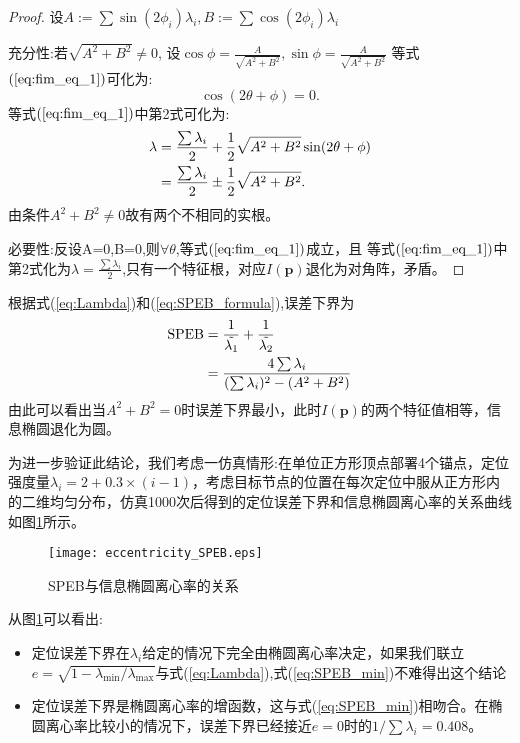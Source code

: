 \begin{proof}
设$A:=\sum\sin(2\phi_i)\lambda_i,B:=\sum\cos(2\phi_i)\lambda_i$

充分性:若$\sqrt{A^2+B^2} \neq 0$,
设$\cos\phi=\frac{A}{\sqrt{A^2+B^2}},\sin\phi=\frac{A}{\sqrt{A^2+B^2}}$
等式$(\ref{eq:fim_eq_1})$可化为:
\begin{equation}
\cos(2\theta+\phi)=0.
\end{equation}
等式$(\ref{eq:fim_eq_1})$中第2式可化为:
\begin{align}\notag\label{eq:Lambda}
\lambda&=\frac{\sum \lambda_i}{2}+\frac{1}{2}\sqrt{A^2+B^2}\sin(2\theta+\phi)\\
&=\frac{\sum \lambda_i}{2}\pm\frac{1}{2}\sqrt{A^2+B^2}.
\end{align}
由条件$A^2+B^2\neq 0$故有两个不相同的实根。

必要性:反设A=0,B=0,则$\forall \theta$,等式$(\ref{eq:fim_eq_1})$成立，且
等式$(\ref{eq:fim_eq_1})$中第2式化为$\lambda=\frac{\sum \lambda_i}{2}$,只有一个特征根，对应$I(\bm{p})$退化为对角阵，矛盾。
\end{proof}
\begin{remark}

根据式(\ref{eq:Lambda})和(\ref{eq:SPEB_formula}),误差下界为
\begin{align}\notag\label{eq:SPEB_min}
\text{SPEB}&=\frac{1} {\tilde{\lambda_1}}+\frac{1}{\tilde{\lambda_2}}\\
&=\frac{4\sum \lambda_i}{(\sum \lambda_i)^2-(A^2+B^2)}
\end{align}
由此可以看出当$A^2+B^2=0$时误差下界最小，此时$I(\bm{p})$的两个特征值相等，信息椭圆退化为圆。

为进一步验证此结论，我们考虑一仿真情形:在单位正方形顶点部署4个锚点，定位强度量$\lambda_i=2+0.3\times(i-1)$，考虑目标节点的位置在每次定位中服从正方形内的二维均匀分布，仿真1000次后得到的定位误差下界和信息椭圆离心率的关系曲线如图\ref{fig:eccentricity}所示。
\begin{figure}
  \centering
  \texttt{[image: eccentricity\_SPEB.eps]}
  \caption{SPEB与信息椭圆离心率的关系}\label{fig:eccentricity}
\end{figure}
从图\ref{fig:eccentricity}可以看出:
\begin{itemize}
  \item 定位误差下界在$\lambda_i$给定的情况下完全由椭圆离心率决定，如果我们联立$e=\sqrt{1-\lambda_{\min}/\lambda_{\max}}$与式(\ref{eq:Lambda}),式(\ref{eq:SPEB_min})不难得出这个结论
  \item 定位误差下界是椭圆离心率的增函数，这与式(\ref{eq:SPEB_min})相吻合。在椭圆离心率比较小的情况下，误差下界已经接近$e=0$时的$1/\sum \lambda_i=0.408$。
\end{itemize}
\end{remark}
